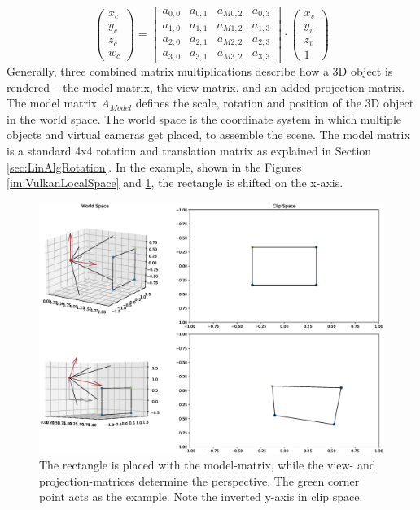 \begin{equation*}
    \begin{pmatrix}
        x_{c} \\
        y_{c} \\
        z_{c} \\
        w_{c}
    \end{pmatrix}
    =
    \begin{bmatrix}
        a_{0,0} & a_{0,1} & a_{M 0,2} & a_{0,3} \\
        a_{1,0} & a_{1,1} & a_{M 1,2} & a_{1,3} \\
        a_{2,0} & a_{2,1} & a_{M 2,2} & a_{2,3} \\
        a_{3,0} & a_{3,1} & a_{M 3,2} & a_{3,3}
    \end{bmatrix}
    \cdot
    \begin{pmatrix}
        x_{v} \\
        y_{v} \\
        z_{v} \\
        1
    \end{pmatrix}
\end{equation*}
Generally, three combined matrix multiplications describe how a 3D object is rendered – the model matrix, the view matrix, and an added projection matrix. The model matrix $A_{Model}$ defines the scale, rotation and position of the 3D object in the world space. The world space is the coordinate system in which multiple objects and virtual cameras get placed, to assemble the scene. The model matrix is a standard 4x4 rotation and translation matrix as explained in Section \ref{sec:LinAlgRotation}. In the example, shown in the Figures \ref{im:VulkanLocalSpace} and \ref{im:VulkanCoords}, the rectangle is shifted on the x-axis.
\begin{figure}[H]
    \centering
    \includegraphics[width=1.0\textwidth]{images/Vulkan_coordinates.eps}
    \caption{The rectangle is placed with the model-matrix, while the view- and projection-matrices determine the perspective. The green corner point acts as the example. Note the inverted y-axis in clip space.}
    \label{im:VulkanCoords}
\end{figure}

